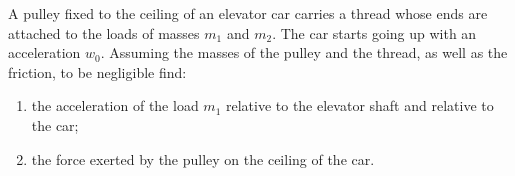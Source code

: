 \item A pulley fixed to the ceiling of an elevator car carries a thread whose ends are attached to the loads of masses $m_1$ and $m_2$. The car starts going up with an acceleration $w_0$. Assuming the masses of the pulley and the thread, as well as the friction, to be negligible find:
    \begin{enumerate}
        \item the acceleration of the load $m_1$ relative to the elevator shaft and relative to the car;
        \item the force exerted by the pulley on the ceiling of the car.
    \end{enumerate}